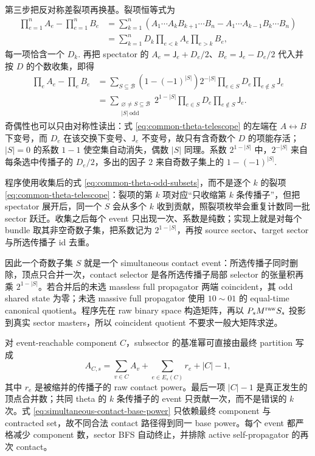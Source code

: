 \documentclass[11pt,a4paper]{ctexart}
\begin{document}
第三步把反对称差裂项再换基。裂项恒等式为
\begin{equation}
\begin{split}
 \prod_{e=1}^{n}A_e-\prod_{e=1}^{n}B_e
 &=\sum_{k=1}^{n}\left(A_1\cdots A_kB_{k+1}\cdots B_n
 -A_1\cdots A_{k-1}B_k\cdots B_n\right)\\
 &=\sum_{k=1}^{n}D_k\prod_{e<k}A_e\prod_{e>k}B_e,
\end{split}
 \label{eq:common-theta-telescope}
\end{equation}
每一项恰含一个 $D_k$. 再把 spectator 的 $A_e=\mathsf J_e+D_e/2$、$B_e=\mathsf J_e-D_e/2$ 代入并按 $D$ 的个数收集，即得
\begin{equation}
\begin{split}
 \prod_eA_e-\prod_eB_e
 &=\sum_{S\subseteq\mathcal B}\left(1-(-1)^{|S|}\right)2^{-|S|}
 \prod_{e\in S}D_e\prod_{e\notin S}\mathsf J_e\\
 &=\sum_{\substack{\varnothing\neq S\subseteq\mathcal B\\|S|\ \text{odd}}}
 2^{1-|S|}\prod_{e\in S}D_e\prod_{e\notin S}\mathsf J_e.
\end{split}
 \label{eq:common-theta-odd-subsets}
\end{equation}
奇偶性也可以只由对称性读出：式 \eqref{eq:common-theta-telescope} 的左端在 $A\leftrightarrow B$ 下变号，而 $D_e$ 在该交换下变号、$\mathsf J_e$ 不变号，故只有含奇数个 $D$ 的项能存活；$|S|=0$ 的系数 $1-1$ 使空集自动消失，偶数 $|S|$ 同理。系数 $2^{1-|S|}$ 中，$2^{-|S|}$ 来自每条选中传播子的 $D_e/2$，多出的因子 $2$ 来自奇数子集上的 $1-(-1)^{|S|}$.

程序使用收集后的式 \eqref{eq:common-theta-odd-subsets}，而不是逐个 $k$ 的裂项 \eqref{eq:common-theta-telescope}：裂项的第 $k$ 项对应“只收缩第 $k$ 条传播子”，但把 spectator 展开后，同一个 $S$ 会从多个 $k$ 收到贡献，照裂项枚举会重复计数同一批 sector 跃迁。收集之后每个 event 只出现一次、系数是纯数；实现上就是对每个 bundle 取其非空奇数子集，把系数记为 $2^{1-|S|}$，再按 source sector、target sector 与所选传播子 id 去重。

因此一个奇数子集 $S$ 就是一个 simultaneous contact event：所选传播子同时删除，顶点只合并一次，contact selector 是各所选传播子局部 selector 的张量积再乘 $2^{1-|S|}$。若合并后的未选 massless full propagator 两端 coincident，其 odd shared state 为零；未选 massive full propagator 使用 $10\sim01$ 的 equal-time canonical quotient。程序先在 raw binary space 构造矩阵，再以 $P_sM^{\rm raw}S_s$ 投影到真实 sector masters，所以 coincident quotient 不要求一般大矩阵求逆。

对 event-reachable component $C$，subsector 的基准幂可直接由最终 partition 写成
\begin{equation}
 A_{C,s}=\sum_{v\in C}A_v
 +\sum_{e\in E_s(C)}r_e+|C|-1,
 \label{eq:simultaneous-contact-base-power}
\end{equation}
其中 $r_e$ 是被缩并的传播子的 raw contact power。最后一项 $|C|-1$ 是真正发生的顶点合并数；共同 theta 的 $k$ 条传播子的 event 只贡献一次，而不是错误的 $k$ 次。式 \eqref{eq:simultaneous-contact-base-power} 只依赖最终 component 与 contracted set，故不同合法 contact 路径得到同一 base power。每个 event 都严格减少 component 数，sector BFS 自动终止，并排除 active self-propagator 的再次 contact。
\end{document}
